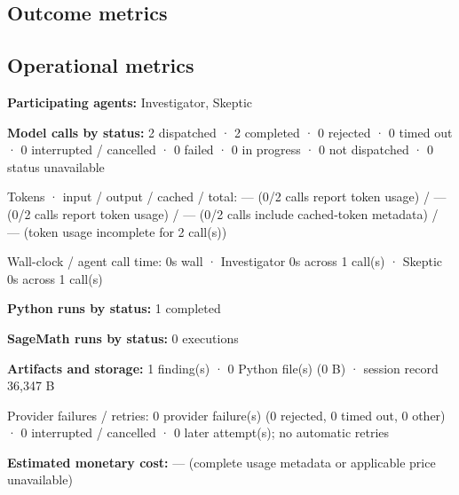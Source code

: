 \documentclass[11pt]{article}
\begin{document}
\subsection{Outcome metrics}
\subsection{Operational metrics}
\textbf{Participating agents:} Investigator, Skeptic\par
\textbf{Model calls by status:} 2 dispatched · 2 completed · 0 rejected · 0 timed out · 0 interrupted / cancelled · 0 failed · 0 in progress · 0 not dispatched · 0 status unavailable\par
Tokens · input / output / cached / total: — (0/2 calls report token usage) / — (0/2 calls report token usage) / — (0/2 calls include cached-token metadata) / — (token usage incomplete for 2 call(s))\par
Wall-clock / agent call time: 0s wall · Investigator 0s across 1 call(s) · Skeptic 0s across 1 call(s)\par
\textbf{Python runs by status:} 1 completed\par
\textbf{SageMath runs by status:} 0 executions\par
\textbf{Artifacts and storage:} 1 finding(s) · 0 Python file(s) (0 B) · session record 36,347 B\par
Provider failures / retries: 0 provider failure(s) (0 rejected, 0 timed out, 0 other) · 0 interrupted / cancelled · 0 later attempt(s); no automatic retries\par
\textbf{Estimated monetary cost:} — (complete usage metadata or applicable price unavailable)\par
\end{document}
